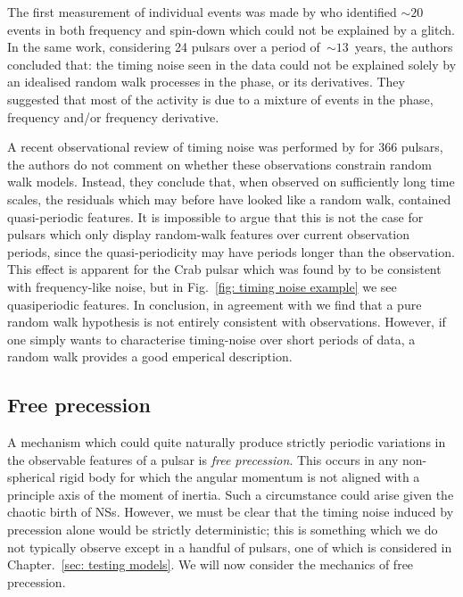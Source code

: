 The first measurement of individual events was made by \citet{Cordes1985} who
identified $\sim20$ events in both frequency and spin-down which could not be
explained by a glitch. In the same work, considering 24 pulsars over a period
of~$\sim13$~years, the authors concluded that: the timing noise seen in the
data could not be explained solely by an idealised random walk processes in the
phase, or its derivatives. They suggested that most of the activity is due to a
mixture of events in the phase, frequency and/or frequency derivative.

A recent observational review of timing noise was performed by
\citet{Hobbs2010} for 366 pulsars, the authors do not comment on whether these
observations constrain random walk models. Instead, they conclude that, when
observed on sufficiently long time scales, the residuals which may before have
looked like a random walk, contained quasi-periodic features. It is impossible
to argue that this is not the case for pulsars which only display random-walk
features over current observation periods, since the quasi-periodicity may have
periods longer than the observation. This effect is apparent for the Crab
pulsar which was found by \citet{Boynton1972} to be consistent with
frequency-like noise, but in Fig.~\ref{fig: timing noise example} we
see quasiperiodic features. In conclusion, in agreement with \citet{Hobbs2010}
we find that a pure random walk hypothesis is not entirely consistent with
observations. However, if one simply wants to characterise timing-noise over
short periods of data, a random walk provides a good emperical description.

\subsection{Free precession}
\label{sec: free precession}

A mechanism which could quite naturally produce strictly periodic variations in
the observable features of a pulsar is \emph{free precession}. This occurs in
any non-spherical rigid body for which the angular momentum is not aligned with a
principle axis of the moment of inertia. Such a circumstance could arise given
the chaotic birth of NSs. However, we must be clear that the timing noise
induced by precession alone would be strictly deterministic; this is something
which we do not typically observe except in a handful of pulsars, one of which
is considered in Chapter.~\ref{sec: testing models}. We will now
consider the mechanics of free precession.

